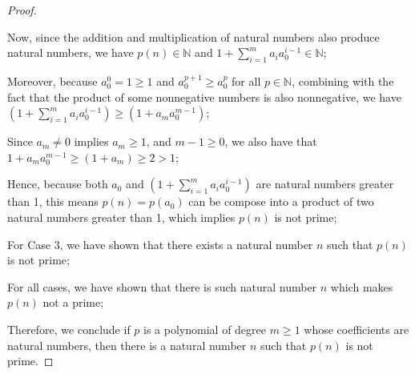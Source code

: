 \documentclass[11pt]{article}
\newcommand{\nats}{\mathbb{N}}
\begin{document}
\begin{proof}
\begin{adjustwidth}{0.5cm}{}
\begin{adjustwidth}{1.25cm}{}
            Now, since the addition and multiplication of natural numbers also produce natural numbers, we have $p(n)\in\nats$ and $1+\displaystyle\sum_{i=1}^m a_i a_0^{i-1}\in\nats$;

            Moreover, because $a_0^0=1\geq1$ and $a_0^{p+1}\geq a_0^{p}$ for all $p\in\nats$, combining with the fact that the product of some nonnegative numbers is also nonnegative, we have $\left(1+\displaystyle\sum_{i=1}^m a_i a_0^{i-1}\right) \geq (1+ a_m a_0^{m-1})$;

            Since $a_m\neq0$ implies $a_m\geq1$, and $m-1\geq0$, we also have that $1+ a_m a_0^{m-1} \geq (1+a_m)\geq 2>1$;
            

            Hence, because both $a_0$ and $\left(1+\displaystyle\sum_{i=1}^m a_i a_0^{i-1}\right)$ are natural numbers greater than 1, this means $p(n)=p(a_0)$ can be compose into a product of two natural numbers greater than 1, which implies $p(n)$ is not prime;
        \end{adjustwidth}
        For Case 3, we have shown that there exists a natural number $n$ such that $p(n)$ is not prime;

        For all cases, we have shown that there is such natural number $n$ which makes $p(n)$ not a prime;
    \end{adjustwidth}
    Therefore, we conclude if $p$ is a polynomial of degree $m\geq1$ whose coefficients are natural numbers, then there is a natural number $n$ such that $p(n)$ is not prime.
\end{proof}
\end{document}
